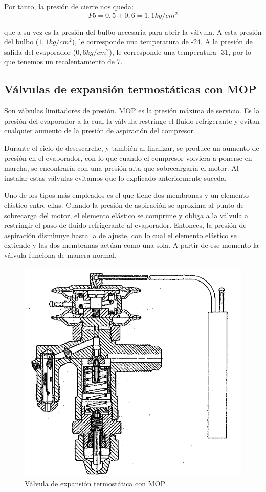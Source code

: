 Por tanto, la presi\'on de cierre nos queda:
\begin{equation*}
    Pb = 0,5 + 0,6 = 1,1 kg/cm^2
\end{equation*}

que a su vez es la presi\'on del bulbo necesaria para abrir la v\'alvula. A esta presi\'on del bulbo ($1,1 kg/cm^2$), le corresponde una temperatura de -24\textcelsius. A la presi\'on de salida del evaporador ($0,6 kg/cm^2$), le corresponde una temperatura -31\textcelsius, por lo que tenemos un recalentamiento de 7\textcelsius.

\subsection{V\'alvulas de expansi\'on termost\'aticas con MOP}

Son v\'alvulas limitadores de presi\'on. MOP es la presi\'on m\'axima de servicio. Es la presi\'on del evaporador a la cual la v\'alvula restringe el fluido refrigerante y evitan cualquier aumento de la presi\'on de aspiraci\'on del compresor.

Durante el ciclo de desescarche, y tambi\'en al finalizar, se produce un aumento de presi\'on en el evaporador, con lo que cuando el compresor volviera a ponerse en marcha, se encontrar\'ia con una presi\'on alta que sobrecargar\'ia el motor. Al instalar estas v\'alvulas evitamos que lo explicado anteriormente suceda.

Uno de los tipos m\'as empleados es el que tiene dos membranas y un elemento el\'astico entre ellas. Cuando la presi\'on de aspiraci\'on se aproxima al punto de sobrecarga del motor, el elemento el\'astico se comprime y obliga a la v\'alvula a restringir el paso de fluido refrigerante al evaporador. Entonces, la presi\'on de aspiraci\'on disminuye hasta la de ajuste, con lo cual el elemento el\'astico se extiende y las dos membranas act\'uan como una sola. A partir de ese momento la v\'alvula funciona de manera normal.

\begin{figure}[H]
    \centering
    \includegraphics[width=.6\linewidth]{figuras/dispositivos-de-expansion/valvula-expansion-mop.png}
    \caption{V\'alvula de expansi\'on termost\'atica con MOP}
    \label{fig:valvula-expansion-mop}
\end{figure}

